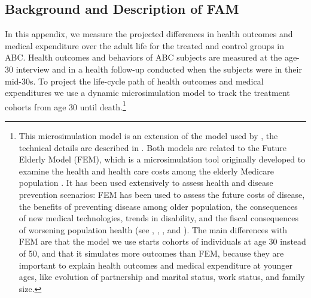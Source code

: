 \subsection{Background and Description of FAM}

\noindent In this appendix, we measure the projected differences in health outcomes and medical expenditure over the adult life for the treated and control groups in ABC.
Health outcomes and behaviors of ABC subjects are measured at the age-30 interview and in a health follow-up conducted when the subjects were in their mid-30s.
To project the life-cycle path of health outcomes and medical expenditures we use a dynamic microsimulation model to track the treatment cohorts from age 30 until death.\footnote{This microsimulation model is an extension of the model used by \citet{Prados_etal_2015_How-Much-Can-Education}, the technical details are described in \citet{Goldman_etal_2015_Future-America-Model}. Both models are related to the Future Elderly Model (FEM), which is a microsimulation tool originally developed to examine the health and health care costs among the elderly Medicare population \citep{Goldman_etal_2004_RAND-Report_Health-Status-Elderly}. It has been used extensively to assess health and disease prevention scenarios: FEM has been used to assess the future costs of disease, the benefits of preventing disease among older population, the consequences of new medical technologies, trends in disability, and the fiscal consequences of worsening population health (see \citet{Goldman_etal_2004_RAND-Report_Health-Status-Elderly}, \citet{Lakdawalla_etal_2004_Health-and-Cost}, \citet{Goldman_etal_2005_HA}, and \citet{Zissimopoulos_etal_2014_Delaying-Alzheimers}). The main differences with FEM are that the model we use starts cohorts of individuals at age 30 instead of 50, and that it simulates more outcomes than FEM, because they are important to explain health outcomes and medical expenditure at younger ages, like evolution of partnership and marital status, work status, and family size.} \\

